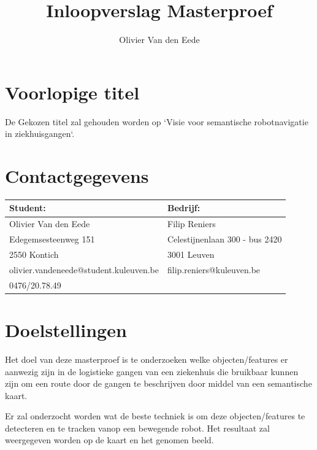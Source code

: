 \documentclass[11pt,a4paper]{article}
\title{Inloopverslag Masterproef}
\author{Olivier Van den Eede}
\date{}
\begin{document}
    \maketitle
    
    \section{Voorlopige titel}
        De Gekozen titel zal gehouden worden op `Visie voor semantische robotnavigatie in ziekhuisgangen`.

    \section{Contactgegevens}
        \begin{table}[h]
            \begin{tabular}{l | l}
                Student: & Bedrijf: \\ \hline
                Olivier Van den Eede & Filip Reniers \\
                Edegemsesteenweg 151 & Celestijnenlaan 300 - bus 2420 \\
                2550 Kontich & 3001 Leuven \\
                olivier.vandeneede@student.kuleuven.be & filip.reniers@kuleuven.be \\
                0476/20.78.49 & \\
            \end{tabular}
        \end{table}

    \section{Doelstellingen}


    Het doel van deze masterproef is te onderzoeken welke objecten/features er aanwezig zijn in de logistieke gangen van een ziekenhuis die bruikbaar kunnen zijn om een route door de gangen te beschrijven door middel van een semantische kaart.
    
    Er zal onderzocht worden wat de beste techniek is om deze objecten/features te detecteren en te tracken vanop een bewegende robot. Het resultaat zal weergegeven worden op de kaart en het genomen beeld.
    
\end{document}
